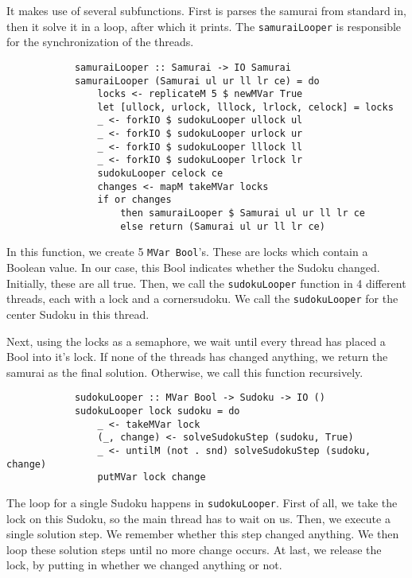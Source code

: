 \documentclass[a4paper,12pt]{article}
\begin{document}
\begin{section}
\begin{subsection}
\begin{subsubsection}
            It makes use of several subfunctions. First is parses the samurai
            from standard in, then it solve it in a loop, after which it prints.
            The \texttt{samuraiLooper} is responsible for the synchronization
            of the threads.

            \begin{lstlisting}
            samuraiLooper :: Samurai -> IO Samurai
            samuraiLooper (Samurai ul ur ll lr ce) = do
                locks <- replicateM 5 $ newMVar True
                let [ullock, urlock, lllock, lrlock, celock] = locks
                _ <- forkIO $ sudokuLooper ullock ul
                _ <- forkIO $ sudokuLooper urlock ur
                _ <- forkIO $ sudokuLooper lllock ll
                _ <- forkIO $ sudokuLooper lrlock lr
                sudokuLooper celock ce
                changes <- mapM takeMVar locks
                if or changes
                    then samuraiLooper $ Samurai ul ur ll lr ce
                    else return (Samurai ul ur ll lr ce)
            \end{lstlisting}

            In this function, we create 5 \texttt{MVar Bool}'s. These are locks
            which contain a Boolean value. In our case, this Bool indicates
            whether the Sudoku changed. Initially, these are all true. Then, we
            call the \texttt{sudokuLooper} function in 4 different threads, each
            with a lock and a cornersudoku. We call the \texttt{sudokuLooper}
            for the center Sudoku in this thread.

            Next, using the locks as a semaphore, we wait until every thread has
            placed a Bool into it's lock. If none of the threads has changed
            anything, we return the samurai as the final solution. Otherwise, we
            call this function recursively.

            \begin{lstlisting}
            sudokuLooper :: MVar Bool -> Sudoku -> IO ()
            sudokuLooper lock sudoku = do
                _ <- takeMVar lock
                (_, change) <- solveSudokuStep (sudoku, True)
                _ <- untilM (not . snd) solveSudokuStep (sudoku, change)
                putMVar lock change
            \end{lstlisting}

            The loop for a single Sudoku happens in \texttt{sudokuLooper}. First
            of all, we take the lock on this Sudoku, so the main thread has to
            wait on us. Then, we execute a single solution step. We remember
            whether this step changed anything. We then loop these solution steps
            until no more change occurs. At last, we release the lock, by
            putting in whether we changed anything or not.


\end{subsubsection}
\end{subsection}
\end{section}
\end{document}
